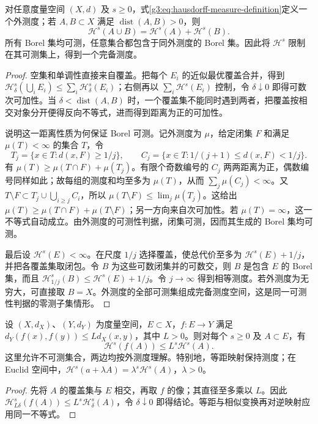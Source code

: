 \begin{proposition}\label{g3:prop:hausdorff-borel-measure}
	对任意度量空间 \((X,d)\) 及 \(s\ge0\)，式\eqref{g3:eq:hausdorff-measure-definition}定义一个外测度；若 \(A,B\subset X\) 满足 \(\operatorname{dist}(A,B)>0\)，则
	\[
		\mathcal H^s(A\cup B)=\mathcal H^s(A)+\mathcal H^s(B).
	\]
	所有 Borel 集均可测，任意集合都包含于同外测度的 Borel 集。因此将 \(\mathcal H^s\) 限制在其可测集上，得到一个完备测度。
\end{proposition}
\begin{proof}
	空集和单调性直接来自覆盖。把每个 \(E_i\) 的近似最优覆盖合并，得到
	\(\mathcal H^s_\delta(\bigcup_iE_i)\le\sum_i\mathcal H^s_\delta(E_i)\)；右侧再以 \(\sum_i\mathcal H^s(E_i)\) 控制，令 \(\delta\downarrow0\) 即得可数次可加性。当 \(\delta<\operatorname{dist}(A,B)\) 时，一个覆盖集不能同时遇到两者，把覆盖按相交对象分开便得反向不等式，进而得到距离为正的可加性。

	说明这一距离性质为何保证 Borel 可测。记外测度为 \(\mu\)，给定闭集 \(F\) 和满足 \(\mu(T)<\infty\) 的集合 \(T\)，令
	\[
		T_j=\{x\in T:d(x,F)\ge1/j\},\qquad
		C_j=\{x\in T:1/(j+1)\le d(x,F)<1/j\}.
	\]
	有 \(\mu(T)\ge\mu(T\cap F)+\mu(T_j)\)。有限个奇数编号的 \(C_j\) 两两距离为正，偶数编号同样如此；故每组的测度和均至多为 \(\mu(T)\)，从而 \(\sum_j\mu(C_j)<\infty\)。又
	\(T\setminus F\subset T_j\cup\bigcup_{i\ge j}C_i\)，所以
	\(\mu(T\setminus F)\le\lim_j\mu(T_j)\)。这给出
	\(\mu(T)\ge\mu(T\cap F)+\mu(T\setminus F)\)；另一方向来自次可加性。若 \(\mu(T)=\infty\)，这一不等式自动成立。由外测度的可测性判据，闭集可测，因而其生成的 Borel 集均可测。

	最后设 \(\mathcal H^s(E)<\infty\)。在尺度 \(1/j\) 选择覆盖，使总代价至多为 \(\mathcal H^s(E)+1/j\)，并把各覆盖集取闭包。令 \(B\) 为这些可数闭集并的可数交，则 \(B\) 是包含 \(E\) 的 Borel 集，而且
	\(\mathcal H^s_{1/j}(B)\le\mathcal H^s(E)+1/j\)。令 \(j\to\infty\) 得到相等测度。若外测度为无穷大，可直接取 \(B=X\)。外测度的全部可测集组成完备测度空间，这是同一可测性判据的零测子集情形。
\end{proof}

\begin{proposition}\label{g3:prop:hausdorff-lipschitz}
	设 \((X,d_X)\)、\((Y,d_Y)\) 为度量空间，\(E\subset X\)，\(f:E\to Y\) 满足
	\(d_Y(f(x),f(y))\le Ld_X(x,y)\)，其中 \(L>0\)。则对每个 \(s\ge0\) 及 \(A\subset E\)，有
	\[
		\mathcal H^s(f(A))\le L^s\mathcal H^s(A).
	\]
	这里允许不可测集合，两边均按外测度理解。特别地，等距映射保持测度；在 Euclid 空间中，\(\mathcal H^s(a+\lambda A)=\lambda^s\mathcal H^s(A)\)，\(\lambda>0\)。
\end{proposition}
\begin{proof}
	先将 \(A\) 的覆盖集与 \(E\) 相交，再取 \(f\) 的像；其直径至多乘以 \(L\)。因此
	\(\mathcal H^s_{L\delta}(f(A))\le L^s\mathcal H^s_\delta(A)\)，令 \(\delta\downarrow0\) 即得结论。等距与相似变换再对逆映射应用同一不等式。
\end{proof}

